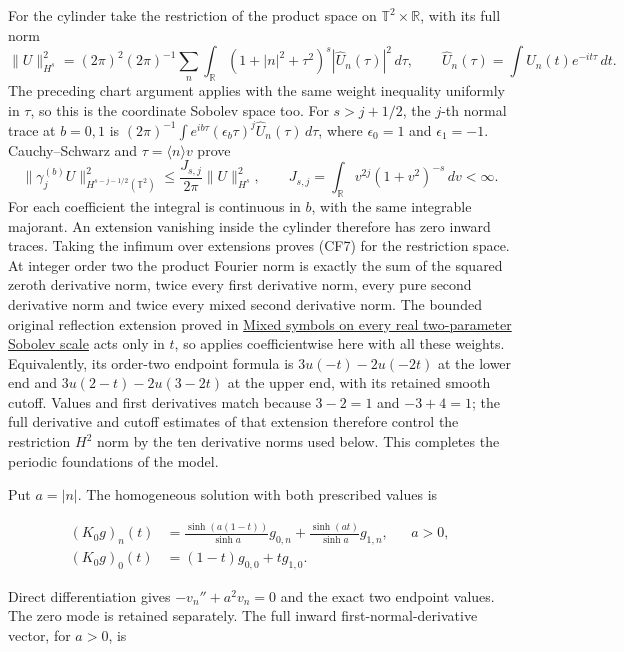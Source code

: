 \documentclass[
  11pt,
]{article}
\begin{document}
For the cylinder take the restriction of the product space on
\(\mathbb T^2\times\mathbb R\), with its full norm \[
 \|U\|_{H^s}^2=(2\pi)^2(2\pi)^{-1}
  \sum_n\int_{\mathbb R}(1+|n|^2+\tau^2)^s
                   |\widehat U_n(\tau)|^2\,d\tau,
 \qquad \widehat U_n(\tau)=\int U_n(t)e^{-it\tau}\,dt.
 \tag{CF6}
\] The preceding chart argument applies with the same weight inequality
uniformly in \(\tau\), so this is the coordinate Sobolev space too. For
\(s>j+1/2\), the \(j\)-th normal trace at \(b=0,1\) is
\((2\pi)^{-1}\int e^{ib\tau}(\epsilon_b\tau)^j
\widehat U_n(\tau)\,d\tau\), where \(\epsilon_0=1\) and
\(\epsilon_1=-1\). Cauchy--Schwarz and \(\tau=\langle n\rangle v\) prove
\[
 \|\gamma_j^{(b)}U\|_{H^{s-j-1/2}(\mathbb T^2)}^2
 \leq\frac{J_{s,j}}{2\pi}\|U\|_{H^s}^2,\qquad
 J_{s,j}=\int_{\mathbb R}v^{2j}(1+v^2)^{-s}\,dv<\infty.
 \tag{CF7}
\] For each coefficient the integral is continuous in \(b\), with the
same integrable majorant. An extension vanishing inside the cylinder
therefore has zero inward traces. Taking the infimum over extensions
proves (CF7) for the restriction space. At integer order two the product
Fourier norm is exactly the sum of the squared zeroth derivative norm,
twice every first derivative norm, every pure second derivative norm and
twice every mixed second derivative norm. The bounded original
reflection extension proved in \href{mixed-sobolev-mapping.pdf}{Mixed
symbols on every real two-parameter Sobolev scale} acts only in \(t\),
so applies coefficientwise here with all these weights. Equivalently,
its order-two endpoint formula is \(3u(-t)-2u(-2t)\) at the lower end
and \(3u(2-t)-2u(3-2t)\) at the upper end, with its retained smooth
cutoff. Values and first derivatives match because \(3-2=1\) and
\(-3+4=1\); the full derivative and cutoff estimates of that extension
therefore control the restriction \(H^2\) norm by the ten derivative
norms used below. This completes the periodic foundations of the model.

Put \(a=|n|\). The homogeneous solution with both prescribed values is

\[
 \begin{aligned}
 (K_0g)_n(t)
 &=\frac{\sinh(a(1-t))}{\sinh a}g_{0,n}
       +\frac{\sinh(at)}{\sinh a}g_{1,n},&&a>0,\\
 (K_0g)_0(t)&=(1-t)g_{0,0}+t g_{1,0}.&&
 \end{aligned}
 \tag{CM3}
\]

Direct differentiation gives \(-v_n''+a^2v_n=0\) and the exact two
endpoint values. The zero mode is retained separately. The full inward
first-normal-derivative vector, for \(a>0\), is
\end{document}
